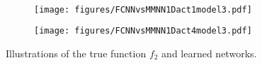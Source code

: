 \documentclass[11pt,a4paper]{article}
\begin{document}
\begin{figure}[ht]
\begin{subfigure}[b]{0.490\textwidth}
                \end{subfigure}
                \\
            \begin{subfigure}[b]{0.490\textwidth}
                    \centering            \texttt{[image: figures/FCNNvsMMNN1Dact1model3.pdf]}
                \end{subfigure}
                \hfill
                \begin{subfigure}[b]{0.490\textwidth}
                    \centering            \texttt{[image: figures/FCNNvsMMNN1Dact4model3.pdf]}
                \end{subfigure}
                \caption{Illustrations of the true function $f_2$ and learned networks.
                }
    \label{fig:MMNNvsFCNN:123}   
\end{figure}
\end{document}

